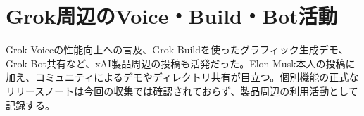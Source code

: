 \section{Grok周辺のVoice・Build・Bot活動}
Grok Voiceの性能向上への言及、Grok Buildを使ったグラフィック生成デモ、Grok Bot共有など、xAI製品周辺の投稿も活発だった。Elon Musk本人の投稿に加え、コミュニティによるデモやディレクトリ共有が目立つ。個別機能の正式なリリースノートは今回の収集では確認されておらず、製品周辺の利用活動として記録する。
